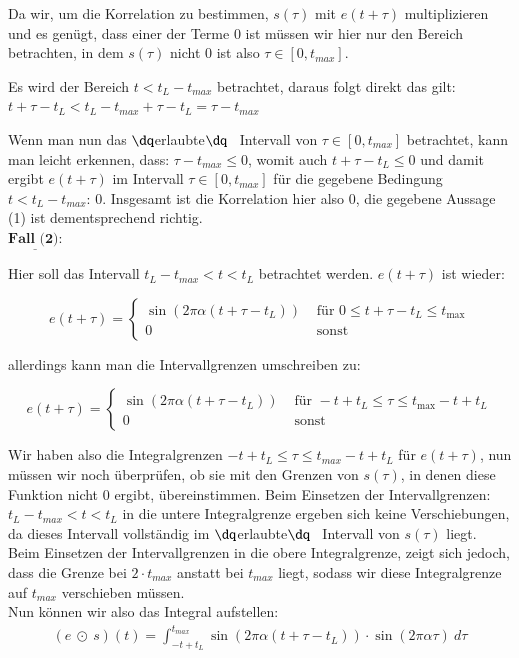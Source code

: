 \documentclass[ngerman]{scrartcl}
\begin{document}
Da wir, um die Korrelation zu bestimmen, $s(\tau)$ mit $e(t+\tau)$ multiplizieren und es genügt, dass einer der Terme 0 ist müssen wir hier nur den Bereich betrachten, in dem $s(\tau)$ nicht 0 ist also $\tau \in [0,t_{max}]$.

Es wird der Bereich $t<t_L-t_{max}$ betrachtet, daraus folgt direkt das gilt: \\
$t+\tau-t_L< t_L -t_{max}+\tau -t_L=\tau-t_{max}$

Wenn man nun das $\dq$erlaubte$\dq$ ~Intervall von $\tau \in [0,t_{max}]$ betrachtet, kann man leicht erkennen, dass:
$\tau- t_{max} \leq 0$, womit auch $t+\tau-t_L \leq 0$ und damit ergibt $e(t+\tau)$ im Intervall $\tau \in [0,t_{max}]$ für die gegebene Bedingung $t<t_L-t_{max}$: 0. Insgesamt ist die Korrelation hier also 0, die gegebene Aussage (1) ist dementsprechend richtig.\\



$\underline{\textbf{Fall (2):}}$

Hier soll das Intervall $t_L-t_{max}<t<t_L$ betrachtet werden. $e(t+\tau)$ ist wieder:

\begin{equation*}
e(t+\tau)=\left\{\begin{array}{ll}
\sin (2 \pi \alpha (t+\tau-t_L)) & \text { für } 0 \leq t+\tau-t_L \leq t_{\max } \\
0 & \text { sonst }
\end{array}\right.
\end{equation*}

allerdings kann man die Intervallgrenzen umschreiben zu:

\begin{equation*}
e(t+\tau)=\left\{\begin{array}{ll}
\sin (2 \pi \alpha (t+\tau-t_L)) & \text { für } -t+t_L \leq \tau \leq t_{\max } -t+t_L \\
0 & \text { sonst }
\end{array}\right.
\end{equation*}


Wir haben also die Integralgrenzen $-t+t_L\leq \tau \leq t_{max}-t+t_L$ für $e(t+\tau)$, nun müssen wir noch überprüfen, ob sie mit den Grenzen von $s(\tau)$, in denen diese Funktion nicht 0 ergibt, übereinstimmen. Beim Einsetzen der Intervallgrenzen: $t_L-t_{max}<t<t_L$ in die untere Integralgrenze ergeben sich keine Verschiebungen, da dieses Intervall vollständig im $\dq$erlaubte$\dq$~ Intervall von $s(\tau)$ liegt. Beim Einsetzen der Intervallgrenzen in die obere Integralgrenze, zeigt sich jedoch, dass die Grenze bei $2 \cdot t_{max}$ anstatt bei $t_{max}$ liegt, sodass wir diese Integralgrenze auf $t_{max}$ verschieben müssen.\\
Nun können wir also das Integral aufstellen:
\begin{align*}
	(e ~\odot~ s)(t)=\int_{-t+t_L}^{t_{max}} \sin (2 \pi \alpha (t+\tau-t_L)) \cdot \sin (2 \pi \alpha \tau)~ d \tau
\end{align*}
\end{document}

